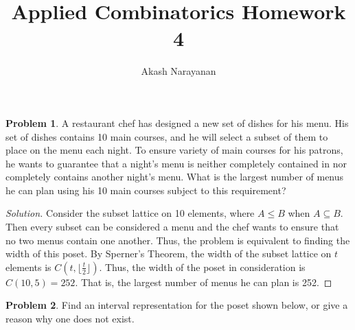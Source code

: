 \documentclass[12pt]{article}
\title{Applied Combinatorics Homework 4}
\author{Akash Narayanan}
\newcounter{chapternumber}
\theoremstyle{definition}
\newtheorem{problem-internal}{Problem}[chapternumber]
\newenvironment{problem}{
  \medskip
  \begin{problem-internal}
}{
\end{problem-internal}
}
\newenvironment{solution}{
  \begin{proof}[Solution]
    \vspace{-8px}
    \setlength{\parskip}{4px}
    \setlength{\parindent}{0px}
}{
\end{proof}
}
\begin{document}
  \maketitle

  \setcounter{chapternumber}{6}
  \setcounter{problem-internal}{10}
  \begin{problem}
    A restaurant chef has designed a new set of dishes for his menu.
    His set of dishes contains 10 main courses, and he will select a subset of them to place on the menu each night.
    To ensure variety of main courses for his patrons, he wants to guarantee that a night's menu is neither completely contained in nor completely contains another night's menu.
    What is the largest number of menus he can plan using his 10 main courses subject to this requirement?
  \end{problem}

  \begin{solution}
    Consider the subset lattice on 10 elements, where \(A \leq B\) when \(A \subseteq B\).
    Then every subset can be considered a menu and the chef wants to ensure that no two menus contain one another.
    Thus, the problem is equivalent to finding the width of this poset.
    By Sperner's Theorem, the width of the subset lattice on \(t\) elements is \(C\left(t, \lfloor{\frac{t}{2}}\rfloor\right)\).
    Thus, the width of the poset in consideration is \(C\left(10, 5\right) = 252\).
    That is, the largest number of menus he can plan is 252.
  \end{solution}

  \setcounter{problem-internal}{13}
  \begin{problem}
    Find an interval representation for the poset shown below, or give a reason why one does not exist.

    \begin{figure}[H]
      \centering
    \end{figure}
  \end{problem}
\end{document}
